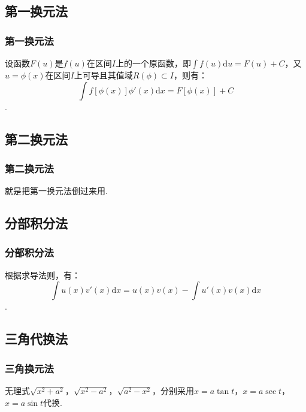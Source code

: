 \documentclass[UTF8, aspectratio = 169, fontsize = 12, hyperref]{ctexbeamer}
\begin{document}
    \subsection{第一换元法}
    \begin{frame}
        \frametitle{第一换元法}
        设函数$F(u)$是$f(u)$在区间$I$上的一个原函数，即$\int{f(u)}\mathrm{d}u=F(u)+C$，又$u=\phi(x)$在区间$I$上可导且其值域$R(\phi)\subset I$，则有：$$\int{f[\phi(x)]\phi'(x)}\mathrm{d}x=F[\phi(x)]+C$$.
    \end{frame}
    \subsection{第二换元法}
    \begin{frame}
        \frametitle{第二换元法}
        就是把第一换元法倒过来用.
    \end{frame}
    \subsection{分部积分法}
    \begin{frame}
        \frametitle{分部积分法}
        根据求导法则，有：$$\int{u(x)v'(x)}\mathrm{d}x=u(x)v(x)-\int{u'(x)v(x)}\mathrm{d}x$$.
    \end{frame}
    \subsection{三角代换法}
    \begin{frame}
        \frametitle{三角换元法}
        无理式$\sqrt{x^2+a^2}$，$\sqrt{x^2-a^2}$，$\sqrt{a^2-x^2}$，分别采用$x=a\tan{t}$，$x=a\sec{t}$，$x=a\sin{t}$代换.
    \end{frame}
\end{document}
